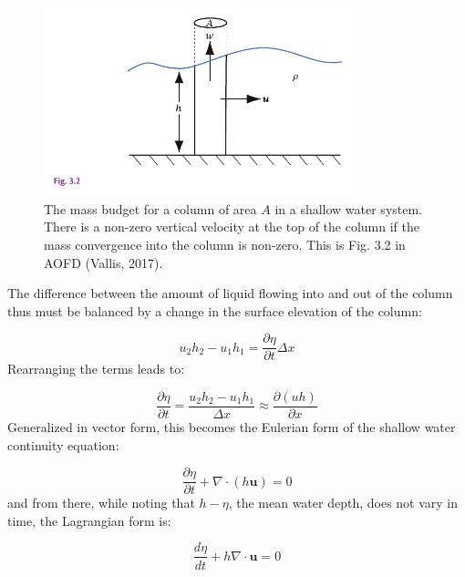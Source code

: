 \documentclass[12pt]{article}
\numberwithin{equation}{section}
\numberwithin{figure}{section}
\numberwithin{table}{section}
\begin{document}
\begin{figure}[h]
  \centering
  \includegraphics[width=0.8\textwidth]{assets/fig_shallow_water2.pdf}
  \caption{
    The mass budget for a column of area $A$ in a shallow water system.
    There is a non-zero vertical velocity at the top of the column if the mass
    convergence into the column is non-zero.
    This is Fig. 3.2 in AOFD (Vallis, 2017).
  }
  \label{fig:shallow_water2}
\end{figure}

The difference between the amount of liquid flowing into and out of the column
thus must be balanced by a change in the surface elevation of the column:

\begin{equation}
  u_2 h_2 - u_1 h_1 = \frac{\partial \eta}{\partial t} \Delta x
\end{equation}
Rearranging the terms leads to:

\begin{equation}
  \frac{\partial \eta}{\partial t} = 
  \frac{u_2 h_2 - u_1 h_1}{\Delta x} \approx
  \frac{\partial (u h)}{\partial x}
  \label{eq:shallow_water_continuity1}
\end{equation}
Generalized in vector form, this becomes the Eulerian form of the shallow water
continuity equation:

\begin{equation}
  \frac{\partial \eta}{\partial t} + \nabla \cdot (h \mathbf{u}) = 0
  \label{eq:shallow_water_continuity2}
\end{equation}
and from there, while noting that $h - \eta$, the mean water depth, does not vary
in time, the Lagrangian form is:

\begin{equation}
  \frac{d \eta}{dt} + h \nabla \cdot \mathbf{u} = 0
  \label{eq:shallow_water_continuity3}
\end{equation}
\end{document}
